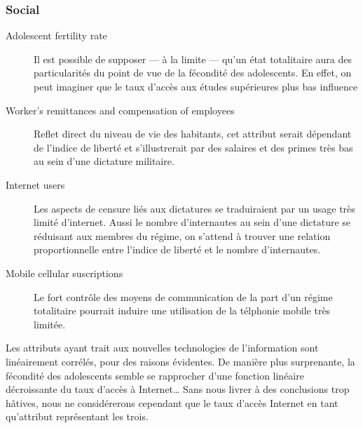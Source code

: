 \subsubsection{Social}
\begin{description}
\item [Adolescent fertility rate] 
Il est possible de supposer --- à la limite --- qu'un état totalitaire aura des particularités du point de vue de la fécondité des adolescents. En effet, on peut imaginer que le taux d'accès aux études supérieures plus bas influence 
\item [Worker's remittances and compensation of employees]
Reflet direct du niveau de vie des habitants, cet attribut serait dépendant de l'indice de liberté et s'illustrerait par des salaires et des primes très bas au sein d'une dictature militaire.
\item [Internet users]
Les aspects de censure liés aux dictatures se traduiraient par un usage très limité d'internet. Aussi le nombre d'internautes 
au sein d'une dictature se réduisant aux membres du régime, on s'attend à trouver une relation proportionnelle entre l'indice de liberté et le nombre d'internautes.
\item [Mobile cellular suscriptions]
Le fort contrôle des moyens de communication de la part d'un régime totalitaire pourrait induire une utilisation de la télphonie mobile très limitée.
\end{description}

Les attributs ayant trait aux nouvelles technologies de l'information sont linéairement corrélés, pour des raisons évidentes. De manière plus surprenante, la fécondité des adolescents semble se rapprocher d'une fonction linéaire décroissante du taux d'accès à Internet\ldots
Sans nous livrer à des conclusions trop hâtives, nous ne considérerons cependant que le taux d'accès Internet en tant qu'attribut représentant les trois.

